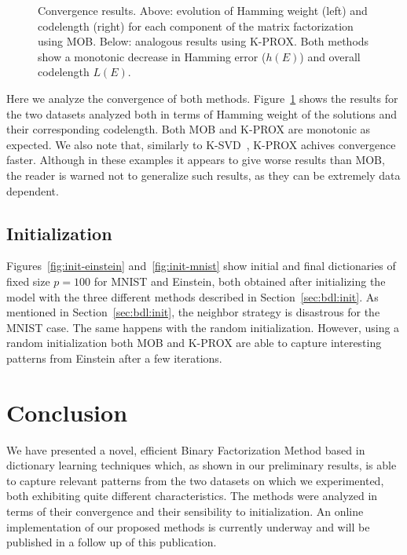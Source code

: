 \documentclass[twocolumn]{IEEEtran}
\theoremstyle{definition}
\begin{document}
\begin{figure}[tp]
\caption{\label{fig:convergence} Convergence results. Above: evolution of Hamming weight (left) and codelength (right) for each component of the matrix factorization using MOB. Below: analogous results using K-PROX. Both methods show a monotonic decrease in Hamming error ($h(E)$) and overall codelength $L(E)$.}
\end{figure}
Here we analyze the convergence of both methods. Figure~\ref{fig:convergence} shows the results for the two datasets analyzed both in terms of Hamming weight of the solutions and their corresponding codelength. Both MOB and K-PROX are monotonic as expected. We also note that, similarly to K-SVD~\cite{ksvd}, K-PROX achives convergence faster.  Although in these examples it appears to give worse results than MOB, the reader is warned not to generalize such results, as they can be extremely data dependent.

\subsection{Initialization}

Figures~\ref{fig:init-einstein} and~\ref{fig:init-mnist} show initial and final dictionaries of fixed size $p=100$ for MNIST and Einstein, both obtained after initializing the model with the three different methods described in Section~\ref{sec:bdl:init}. As mentioned in Section~\ref{sec:bdl:init}, the neighbor strategy is disastrous for the MNIST case. The same happens with the random initialization.  However, using a random initialization both MOB and K-PROX are able to capture interesting patterns from Einstein after a few iterations. 

\section{Conclusion}
\label{sec:conclusion}

We have presented a novel, efficient Binary Factorization Method based in dictionary learning techniques which, as shown in our preliminary results, is able to capture relevant patterns from the two datasets on which we experimented, both exhibiting quite different characteristics. The methods were analyzed in terms of their convergence and their sensibility to initialization. An online implementation of our proposed methods is currently underway and will be published in a follow up of this publication.



\balance
\end{document}
